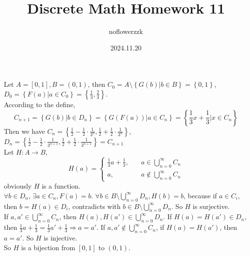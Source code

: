 \documentclass{article}
\title{Discrete Math Homework 11}
\author{noflowerzzk}
\date{2024.11.20}
\begin{document}
\maketitle

\section{}

Let $A = [0, 1], B = (0, 1)$, then $C_0 = A \setminus \left\{G(b) | b \in B\right\} = \left\{0, 1\right\}$, $D_0 = \left\{F(a) | a \in C_0 \right\} = \left\{\frac{1}{3}, \frac{2}{3}\right\}$. \\
According to the define, 
\[
    C_{n + 1} = \left\{G(b) | b \in D_n\right\} = \left\{G(F(a)) | a \in C_n\right\} = \left\{\frac{1}{3}x +\frac{1}{3} | x \in C_n\right\}
\]
Then we have $C_n = \left\{\frac{1}{2} - \frac{1}{2}\cdot \frac{1}{3^n}, \frac{1}{2} + \frac{1}{2}\cdot \frac{1}{3^n}\right\}$, $D_n = \left\{\frac{1}{2} - \frac{1}{2}\cdot \frac{1}{3^{n + 1}}, \frac{1}{2} + \frac{1}{2}\cdot \frac{1}{3^{n + 1}}\right\} = C_{n + 1}$ \\
Let $H: A \to B$, 
\[H(a) = \begin{cases}
    \frac{1}{3}a + \frac{1}{3}, & \quad a \in \bigcup_{n = 0}^{\infty}C_n \\
    a, & \quad a \notin \bigcup_{n = 0}^{\infty}C_n
\end{cases}\]
obviously $H$ is a function. \\
$\forall b \in D_n$, $\exists a \in C_n, F(a) = b$. $\forall b \in B \setminus \bigcup_{n = 0}^{\infty}D_n, H(b) = b$, because if $a \in C_i$, then $b = H(a) \in D_i$, contradicts with $b \in B \setminus \bigcup_{n = 0}^{\infty}D_n$. So $H$ is surjective. \\
If $a, a' \in \bigcup_{n = 0}^{\infty}C_n$, then $H(a), H(a') \in \bigcup_{n = 0}^{\infty}D_n$. If $H(a) = H(a') \in D_n$, then $\frac{1}{3}a + \frac{1}{3} = \frac{1}{3}a' + \frac{1}{3} \Rightarrow a = a'$.
If $a, a' \notin \bigcup_{n = 0}^{\infty}C_n$, if $H(a) = H(a')$, then $a = a'$. So $H$ is injective. \\
So $H$ is a bijection from $[0, 1]$ to $(0, 1)$.

\section{}
\end{document}
